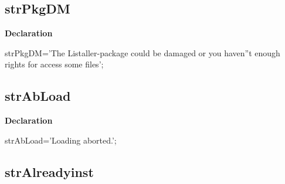 \documentclass{report}
\newif\ifpdf
\begin{document}
\subsection*{strPkgDM}
\fi
\label{trstrings-strPkgDM}
\begin{list}{}{
\setlength{\itemindent}{0cm}
\setlength{\listparindent}{0cm}
\setlength{\leftmargin}{\evensidemargin}
\addtolength{\leftmargin}{\tmplength}
\settowidth{\labelsep}{X}
\addtolength{\leftmargin}{\labelsep}
\setlength{\labelwidth}{\tmplength}
}
\item[\textbf{Declaration}\hfill]
\ifpdf
\begin{flushleft}
\fi
\begin{ttfamily}
strPkgDM='The Listaller-package could be damaged or you haven''t enough rights for access some files';\end{ttfamily}

\ifpdf
\end{flushleft}
\fi

\end{list}
\ifpdf
\subsection*{\large{\textbf{strAbLoad}}\normalsize\hspace{1ex}\hrulefill}
\else
\subsection*{strAbLoad}
\fi
\label{trstrings-strAbLoad}
\begin{list}{}{
\setlength{\itemindent}{0cm}
\setlength{\listparindent}{0cm}
\setlength{\leftmargin}{\evensidemargin}
\addtolength{\leftmargin}{\tmplength}
\settowidth{\labelsep}{X}
\addtolength{\leftmargin}{\labelsep}
\setlength{\labelwidth}{\tmplength}
}
\item[\textbf{Declaration}\hfill]
\ifpdf
\begin{flushleft}
\fi
\begin{ttfamily}
strAbLoad='Loading aborted.';\end{ttfamily}

\ifpdf
\end{flushleft}
\fi

\end{list}
\ifpdf
\subsection*{\large{\textbf{strAlreadyinst}}\normalsize\hspace{1ex}\hrulefill}
\else
\end{document}

